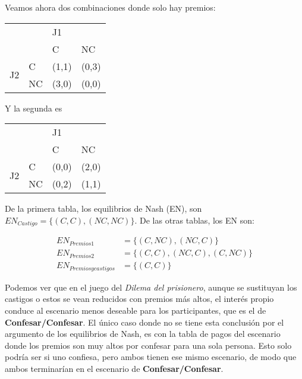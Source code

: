 \documentclass{homework}
\begin{document}
Veamos ahora dos combinaciones donde solo hay premios:

\begin{table}[h!]
\begin{tabular}{|ll|ll|}
\hline
\multicolumn{2}{|l|}{\multirow{2}{*}{}} & \multicolumn{2}{l|}{J1} \\ \cline{3-4} 
\multicolumn{2}{|l|}{} & \multicolumn{1}{l|}{C} & NC \\ \hline
\multicolumn{1}{|c|}{\multirow{2}{*}{J2}} & C & \multicolumn{1}{l|}{(1,1)} & (0,3) \\ \cline{2-4} 
\multicolumn{1}{|c|}{} & NC & \multicolumn{1}{l|}{(3,0)} & (0,0) \\ \hline
\end{tabular}
\end{table}

Y la segunda es

\begin{table}[h!]
\begin{tabular}{|ll|ll|}
\hline
\multicolumn{2}{|l|}{\multirow{2}{*}{}} & \multicolumn{2}{l|}{J1} \\ \cline{3-4} 
\multicolumn{2}{|l|}{} & \multicolumn{1}{l|}{C} & NC \\ \hline
\multicolumn{1}{|c|}{\multirow{2}{*}{J2}} & C & \multicolumn{1}{l|}{(0,0)} & (2,0) \\ \cline{2-4} 
\multicolumn{1}{|c|}{} & NC & \multicolumn{1}{l|}{(0,2)} & (1,1) \\ \hline
\end{tabular}
\end{table}

De la primera tabla, los equilibrios de Nash (EN), son $EN_{Castigo} = \{(C,C), (NC,NC)\}$. De las otras tablas, los EN son:

\begin{equation} \label{eq1}
\begin{split}
EN_{Premios 1} & = \{(C,NC), (NC, C)\} \\
EN_{Premios 2} & = \{(C,C), (NC, C), (C, NC)\} \\
EN_{Premios y castigos} & = \{(C,C)\}
\end{split}
\end{equation}


Podemos ver que en el juego del \textit{Dilema del prisionero}, aunque se sustituyan los castigos o estos se vean reducidos con premios más altos, el interés propio conduce al escenario menos deseable para los participantes, que es el de \textbf{Confesar/Confesar}. El único caso donde no se tiene esta conclusión por el argumento de los equilibrios de Nash, es con la tabla de pagos del escenario donde los premios son muy altos por confesar para una sola persona. Esto solo podría ser si uno confiesa, pero ambos tienen ese mismo escenario, de modo que ambos terminarían en el escenario de \textbf{Confesar/Confesar}.
\end{document}
